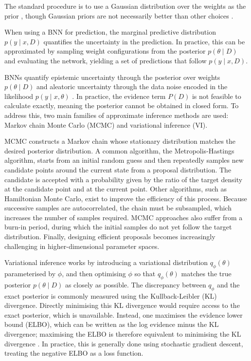 The standard procedure is to use a Gaussian distribution over the weights as the prior
\parencite{jospinHandsOnBayesianNeural2022}, though Gaussian priors are not necessarily better than other choices
\parencite{silvestroPriorChoiceAffects2020}.

When using a BNN for prediction, the marginal predictive distribution $p(y \mid x, D)$ quantifies the uncertainty in the prediction.
In practice, this can be approximated by sampling weight configurations from the posterior $p(\theta \mid D)$ and evaluating the network, yielding a set of predictions that follow $p(y \mid x, D)$.

BNNs quantify epistemic uncertainty through the posterior over weights $p(\theta \mid D)$ and aleatoric uncertainty through the data noise encoded in the likelihood $p(y \mid x, \theta)$ \parencite{jospinHandsOnBayesianNeural2022,kendallWhatUncertaintiesWe2017}.
In practice, the evidence term $P(D)$ is not feasible to calculate exactly, meaning the posterior cannot be obtained in closed form.
To address this, two main families of approximate inference methods are used: Markov chain Monte Carlo (MCMC) and variational inference (VI).

MCMC constructs a Markov chain whose stationary distribution matches the desired posterior distribution.
A common algorithm, the Metropolis-Hastings algorithm, starts from an initial random guess and then repeatedly samples new candidate points around the current state from a proposal distribution.
The candidate is accepted with a probability given by the ratio of the target density at the candidate point and at the current point.
Other algorithms, such as Hamiltonian Monte Carlo, exist to improve the efficiency of this process.
Because successive samples are autocorrelated, the chain must be subsampled, which increases the number of samples required.
MCMC approaches also suffer from a burn-in period, during which the initial samples do not yet follow the target distribution.
Finally, designing efficient proposals becomes increasingly challenging in higher-dimensional parameter spaces.

Variational inference works by introducing a variational distribution $q_\phi(\theta)$ parameterised by $\phi$, and then optimising $\phi$ so that $q_\phi(\theta)$ matches the true posterior $p(\theta \mid D)$ as closely as possible.
The discrepancy between $q_\phi$ and the exact posterior is commonly measured using the Kullback-Leibler (KL) divergence.
Directly minimising this KL divergence would require access to the exact posterior, which is unavailable.
Instead, one maximises the evidence lower bound (ELBO), which can be written as the log evidence minus the KL divergence; maximising the ELBO is therefore equivalent to minimising the KL divergence
\parencite{kingmaAutoEncodingVariationalBayes2014,blundellWeightUncertaintyNeural2015}.
In practice, this is generally done using stochastic gradient descent, treating the negative ELBO as a loss function.

